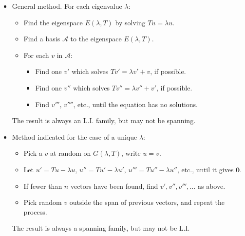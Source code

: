 \documentclass[11pt]{article}
\newcommand{\1}{\mathbf{1}}
\newcommand{\0}{\mathbf{0}}
\newcommand{\A}{\mathcal{A}}
\newcommand{\B}{\mathcal{B}}
\theoremstyle{definition}
\begin{document}
\begin{itemize}
\item
General method.
For each eigenvalue $\lambda$:
\begin{itemize}
\item
Find the eigenspace $E(\lambda,T)$ by solving $Tu = \lambda u$.
\item
Find a basis $\A$ to the eigenspace $E(\lambda,T)$.
\item
For each $v$ in $\A$:
\begin{itemize}
\item
Find one $v'$ which solves $Tv' = \lambda v' + v$, if possible.
\item
Find one $v''$ which solves $Tv'' = \lambda v'' + v'$, if possible.
\item
Find $v'''$, $v''''$, etc., until the equation has no solutions.
\end{itemize}
\end{itemize}
The result is always an L.I. family, but may not be spanning.
\item
Method indicated for the case of a unique $\lambda$:
\begin{itemize}
\item
Pick a $v$ at random on $ G(\lambda,T) $, write $u=v$.
\item
Let $u' = Tu - \lambda u$, $u'' = Tu' - \lambda u'$, $u'''= Tu'' - \lambda u''$, etc., until it gives $\0$.
\item
If fewer than $n$ vectors have been found, find $v',v'',v''',\dots$ as above.
\item
Pick random $v$ outside the span of previous vectors, and repeat the process.
\end{itemize}
The result is always a spanning family, but may not be L.I.
\end{itemize}
\end{document}
